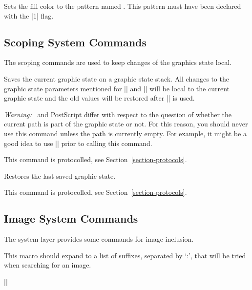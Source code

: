 \begin{command}{\pgfsys@setpatterncolored{}}
  Sets the fill color to the pattern named . This pattern
  must have been declared with the |1| flag.
\end{command}



\subsection{Scoping System Commands}

The scoping commands are used to keep changes of the graphics state
local.

\begin{command}{\pgfsys@beginscope}
  Saves the current graphic state on a graphic state stack. All
  changes to the graphic state parameters mentioned for |\pgfsys@stroke|
  and |\pgfsys@fill| will be local to the current graphic state and
  the old values will be restored after |\pgfsys@endscope| is used.

  \emph{Warning:} \pdf\ and PostScript differ with respect to the
  question of whether the current path is part of the graphic state or
  not. For this reason, you should never use this command unless the
  path is currently empty. For example, it might be a good idea to use
  |\pgfsys@discardpath| prior to calling this command.

  This command is protocolled, see Section~\ref{section-protocols}.
\end{command}

\begin{command}{\pgfsys@endscope}
  Restores the last saved graphic state.

  This command is protocolled, see Section~\ref{section-protocols}.
\end{command}







\subsection{Image System Commands}

The system layer provides some commands for image inclusion.

\begin{command}{\pgfsys@imagesuffixlist}
  This macro should expand to a list of suffixes, separated by `:',
  that will be tried when searching for an image.

  \example |\def\pgfsys@imagesuffixlist{eps:epsi:ps}|
\end{command}



